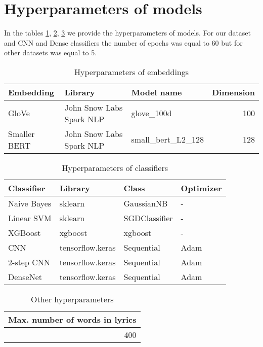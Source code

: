 \section{Hyperparameters of models}\label{hyperparameters}
In the tables \ref{tab:h_emb}, \ref{tab:h_cls}, \ref{tab:h_other} we provide the hyperparameters of models. For our dataset and CNN and Dense classifiers the number of epochs was equal to 60 but for other datasets was equal to 5.

\onecolumn

\begin{table}[h]
\centering
\begin{tabular}{l|l|l|r}
\textbf{Embedding} & \textbf{Library} & \textbf{Model name} & \textbf{Dimension} \\\hline
GloVe & John Snow Labs Spark NLP & glove\_100d & 100 \\
Smaller BERT & John Snow Labs Spark NLP & small\_bert\_L2\_128 & 128 \\
\end{tabular}
\caption{Hyperparameters of embeddings}
\label{tab:h_emb}
\end{table}

\begin{table}[h]
\centering
\begin{tabular}{l|l|l|l}
\textbf{Classifier} & \textbf{Library} & \textbf{Class} & \textbf{Optimizer} \\\hline
Naive Bayes & sklearn & GaussianNB & - \\
Linear SVM & sklearn & SGDClassifier & - \\
XGBoost & xgboost & xgboost & - \\
CNN & tensorflow.keras & Sequential & Adam \\
2-step CNN & tensorflow.keras & Sequential & Adam \\
DenseNet & tensorflow.keras & Sequential & Adam \\
\end{tabular}
\caption{Hyperparameters of classifiers}
\label{tab:h_cls}
\end{table}

\begin{table}[h]
\centering
\begin{tabular}{r}
\textbf{Max. number of words in lyrics} \\\hline
400 \\
\end{tabular}
\caption{Other hyperparameters}
\label{tab:h_other}
\end{table}

\twocolumn